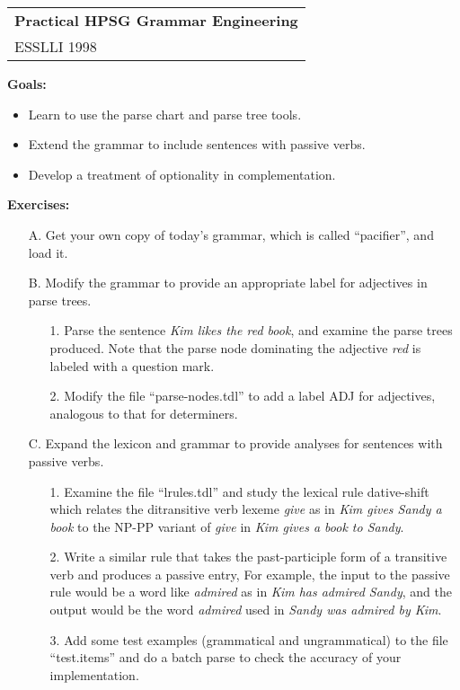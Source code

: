 \documentclass[10pt]{article}
\begin{document}
\begin{tabular}[t]{@{}l@{}}
\textbf{Practical HPSG Grammar Engineering}\\
ESSLLI 1998
\end{tabular}
\hfill
\mbox{}

\bigskip
\bigskip
\textbf{Goals:}
\begin{itemize}
\item Learn to use the parse chart and parse tree tools.
\item Extend the grammar to include sentences with passive verbs.
\item Develop a treatment of optionality in complementation.
\end{itemize}

\smallskip
\textbf{Exercises:}
\begin{itemize}
\item[A.] Get your own copy of today's grammar, which is called ``pacifier'', and load it.
\item[B.] Modify the grammar to provide an appropriate label for
adjectives in parse trees.
\begin{itemize}
\item[1.] Parse the sentence \emph{Kim likes the red book}, and examine the parse trees produced.  Note that the parse node dominating the adjective \emph{red} is labeled with a question mark.
\item[2.] Modify the file ``parse-nodes.tdl'' to add a label \textsf{ADJ} for adjectives, analogous to that for determiners.
\end{itemize}
\item[C.] Expand the lexicon and grammar to provide analyses for sentences with passive verbs.
\begin{itemize}
\item[1.] Examine the file ``lrules.tdl'' and study the lexical rule
\textsf{dative-shift} which relates the ditransitive verb lexeme \emph{give} as in \emph{Kim gives Sandy a book} to the NP-PP variant of \emph{give} in \emph{Kim gives a book to Sandy}.
\item[2.] Write a similar rule that takes the past-participle form of a
transitive verb and produces a passive entry,  For example, the input
to the passive rule would be a word like \emph{admired} as in \emph{Kim has
admired Sandy}, and the output would be the word \emph{admired} used in
\emph{Sandy was admired by Kim}.
\item[3.] Add some test examples (grammatical and ungrammatical) to the file ``test.items'' and do a batch parse to check the accuracy of your implementation.

\end{itemize}
\end{itemize}
\end{document}

